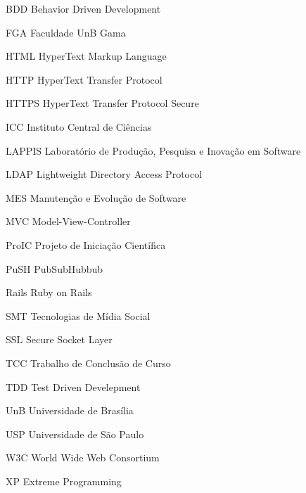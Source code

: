 \begin{siglas}
  \item[BDD] Behavior Driven Development
  \item[FGA] Faculdade UnB Gama
  \item[HTML] HyperText Markup Language
  \item[HTTP] HyperText Transfer Protocol
  \item[HTTPS] HyperText Transfer Protocol Secure
  \item[ICC] Instituto Central de Ciências
  \item[LAPPIS] Laboratório de Produção, Pesquisa e Inovação em Software
  \item[LDAP] Lightweight Directory Access Protocol
  \item[MES] Manutenção e Evolução de Software
  \item[MVC] Model-View-Controller
  \item[ProIC] Projeto de Iniciação Científica
  \item[PuSH] PubSubHubbub
  \item[Rails] Ruby on Rails
  \item[SMT] Tecnologias de Mídia Social
  \item[SSL] Secure Socket Layer
  \item[TCC] Trabalho de Conclusão de Curso
  \item[TDD] Test Driven Develepment
  \item[UnB] Universidade de Brasília
  \item[USP] Universidade de São Paulo
  \item[W3C] World Wide Web Consortium
  \item[XP] Extreme Programming
\end{siglas}
